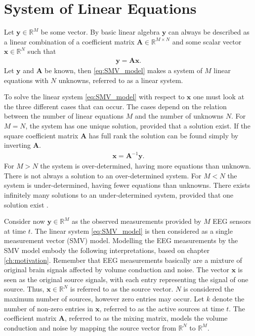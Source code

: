 \section{System of Linear Equations}\label{sec:SMV}
Let $\mathbf{y} \in \mathbb{R}^M$ be some vector. By basic linear algebra $\mathbf{y}$ can always be described as a linear combination of a coefficient matrix $\mathbf{A} \in \mathbb{R}^{M \times N}$ and some scalar vector $\mathbf{x} \in \mathbb{R}^N$ such that
\begin{align}\label{eq:SMV_model}
\mathbf{y} = \mathbf{Ax}.
\end{align}
Let $\mathbf{y}$ and $\mathbf{A}$ be known, then  
\ref{eq:SMV_model} makes a system of $M$ linear equations with $N$ unknowns, referred to as a linear system. 

To solve the linear system \ref{eq:SMV_model} with respect to $\textbf{x}$ one must look at the three different cases that can occur. 
The cases depend on the relation between the number of linear equations $M$ and the number of unknowns $N$.
For $M = N$, the system has one unique solution, provided that a solution exist. 
If the square coefficient matrix $\mathbf{A}$ has full rank the solution can be found simply by inverting $\mathbf{A}$.
\begin{align*}
\mathbf{x} = \mathbf{A}^{-1} \mathbf{y}.
\end{align*}
For $M > N$ the system is over-determined, having more equations than unknown. 
There is not always a solution to an over-determined system.   
For $M < N$ the system is under-determined, having fewer equations than unknowns. 
There exists infinitely many solutions to an under-determined system, provided that one solution exist \cite[p. ix]{CS}.  

Consider now $\mathbf{y} \in \mathbb{R}^M$ as the observed measurements provided by $M$ EEG sensors at time $t$. 
The linear system \ref{eq:SMV_model} is then considered as a single measurement vector (SMV) model.  
Modelling the EEG measurements by the SMV model embody the following interpretations, based on chapter \ref{ch:motivation}.
Remember that EEG measurements basically are a mixture of original brain signals affected by volume conduction and noise.
The vector $\mathbf{x}$ is seen as the original source signals, with each entry representing the signal of one source. 
Thus, $\mathbf{x} \in \mathbb{R}^N$ is referred to as the source vector. 
$N$ is considered the maximum number of sources, however zero entries may occur. 
Let $k$ denote the number of non-zero entries in $\mathbf{x}$, referred to as the active sources at time $t$.   
The coefficient matrix $\mathbf{A}$, referred to as the mixing matrix, models the volume conduction and noise by mapping the source vector from $\mathbb{R}^N$ to $\mathbb{R}^M$.            

